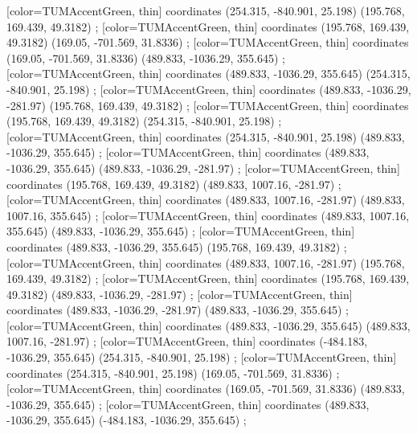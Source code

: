         [color=TUMAccentGreen, thin] coordinates { (254.315, -840.901, 25.198) (195.768, 169.439, 49.3182) };
        [color=TUMAccentGreen, thin] coordinates { (195.768, 169.439, 49.3182) (169.05, -701.569, 31.8336) };
        [color=TUMAccentGreen, thin] coordinates { (169.05, -701.569, 31.8336) (489.833, -1036.29, 355.645) };
        [color=TUMAccentGreen, thin] coordinates { (489.833, -1036.29, 355.645) (254.315, -840.901, 25.198) };
        [color=TUMAccentGreen, thin] coordinates { (489.833, -1036.29, -281.97) (195.768, 169.439, 49.3182) };
        [color=TUMAccentGreen, thin] coordinates { (195.768, 169.439, 49.3182) (254.315, -840.901, 25.198) };
        [color=TUMAccentGreen, thin] coordinates { (254.315, -840.901, 25.198) (489.833, -1036.29, 355.645) };
        [color=TUMAccentGreen, thin] coordinates { (489.833, -1036.29, 355.645) (489.833, -1036.29, -281.97) };
        [color=TUMAccentGreen, thin] coordinates { (195.768, 169.439, 49.3182) (489.833, 1007.16, -281.97) };
        [color=TUMAccentGreen, thin] coordinates { (489.833, 1007.16, -281.97) (489.833, 1007.16, 355.645) };
        [color=TUMAccentGreen, thin] coordinates { (489.833, 1007.16, 355.645) (489.833, -1036.29, 355.645) };
        [color=TUMAccentGreen, thin] coordinates { (489.833, -1036.29, 355.645) (195.768, 169.439, 49.3182) };
        [color=TUMAccentGreen, thin] coordinates { (489.833, 1007.16, -281.97) (195.768, 169.439, 49.3182) };
        [color=TUMAccentGreen, thin] coordinates { (195.768, 169.439, 49.3182) (489.833, -1036.29, -281.97) };
        [color=TUMAccentGreen, thin] coordinates { (489.833, -1036.29, -281.97) (489.833, -1036.29, 355.645) };
        [color=TUMAccentGreen, thin] coordinates { (489.833, -1036.29, 355.645) (489.833, 1007.16, -281.97) };
        [color=TUMAccentGreen, thin] coordinates { (-484.183, -1036.29, 355.645) (254.315, -840.901, 25.198) };
        [color=TUMAccentGreen, thin] coordinates { (254.315, -840.901, 25.198) (169.05, -701.569, 31.8336) };
        [color=TUMAccentGreen, thin] coordinates { (169.05, -701.569, 31.8336) (489.833, -1036.29, 355.645) };
        [color=TUMAccentGreen, thin] coordinates { (489.833, -1036.29, 355.645) (-484.183, -1036.29, 355.645) };
